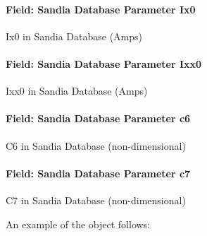 \paragraph{Field: Sandia Database Parameter Ix0}\label{field-sandia-database-parameter-ix0}

Ix0 in Sandia Database (Amps)

\paragraph{Field: Sandia Database Parameter Ixx0}\label{field-sandia-database-parameter-ixx0}

Ixx0 in Sandia Database (Amps)

\paragraph{Field: Sandia Database Parameter c6}\label{field-sandia-database-parameter-c6}

C6 in Sandia Database (non-dimensional)

\paragraph{Field: Sandia Database Parameter c7}\label{field-sandia-database-parameter-c7}

C7 in Sandia Database (non-dimensional)

An example of the object follows:

